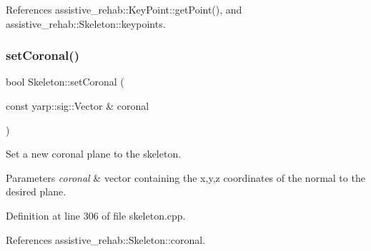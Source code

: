 References assistive\+\_\+rehab\+::\+Key\+Point\+::get\+Point(), and assistive\+\_\+rehab\+::\+Skeleton\+::keypoints.

\mbox{\label{classassistive__rehab_1_1Skeleton_ab3bd697f48ea69cfdc5ff7574c19041f}} 
\subsubsection{\texorpdfstring{setCoronal()}{setCoronal()}}
{\footnotesize\ttfamily bool Skeleton\+::set\+Coronal (\begin{DoxyParamCaption}\item[{const yarp\+::sig\+::\+Vector \&}]{coronal }\end{DoxyParamCaption})\hspace{0.3cm}{\ttfamily [inherited]}}



Set a new coronal plane to the skeleton. 


\begin{DoxyParams}{Parameters}
{\em coronal} & vector containing the x,y,z coordinates of the normal to the desired plane. \\
\hline
\end{DoxyParams}


Definition at line 306 of file skeleton.\+cpp.


\begin{DoxyCode}{0}

\end{DoxyCode}


References assistive\+\_\+rehab\+::\+Skeleton\+::coronal.

\mbox{\label{classassistive__rehab_1_1Skeleton_af92fdb0e3eb88a0b1dedd5038e2c6eb7}} 

